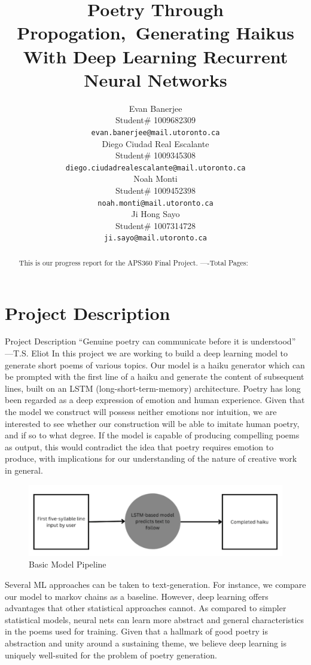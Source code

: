 \documentclass{article} %
\title{Poetry Through Propogation,\ Generating Haikus With Deep Learning Recurrent Neural Networks}
\author{Evan Banerjee  \\
Student\# 1009682309\\
\texttt{evan.banerjee@mail.utoronto.ca} \\
\And
Diego Ciudad Real Escalante  \\
Student\# 1009345308 \\
\texttt{diego.ciudadrealescalante@mail.utoronto.ca} \\
\AND
Noah Monti  \\
Student\# 1009452398 \\
\texttt{noah.monti@mail.utoronto.ca} \\
\And
Ji Hong Sayo \\
Student\# 1007314728 \\
\texttt{ji.sayo@mail.utoronto.ca} \\
\AND
}
\begin{document}
\maketitle

\begin{abstract}
This is our progress report for the APS360 Final Project.
----Total Pages: \pageref{last_page}
\end{abstract}



\section{Project Description}

Project Description
“Genuine poetry can communicate before it is understood” —T.S. Eliot
In this project we are working to build a deep learning model to generate short poems of various topics. 
Our model is a haiku generator which can be prompted with the first line of a haiku and generate the content of subsequent lines, built on an LSTM (long-short-term-memory) architecture.
Poetry has long been regarded as a deep expression of emotion and human experience. Given that the model we construct will possess neither emotions nor intuition, we are interested to see whether our construction will be able to imitate human poetry, and if so to what degree. If the model is capable of producing compelling poems as output, this would contradict the idea that poetry requires emotion to produce, with implications for our understanding of the nature of creative work in general.

\begin{figure}[h]
  \begin{center}
  \includegraphics[width=1\textwidth]{Figs/pipeline.png}
  \end{center}
  \caption{Basic Model Pipeline}
  \label{fig:pipeline}
\end{figure}

Several ML approaches can be taken to text-generation. 
For instance, we compare our model to markov chains as a baseline. 
However, deep learning offers advantages that other statistical approaches cannot. 
As compared to simpler statistical models, neural nets can learn more abstract and general characteristics in the poems used for training. 
Given that a hallmark of good poetry is abstraction and unity around a sustaining theme, 
we believe deep learning is uniquely well-suited for the problem of poetry generation.
\end{document}
